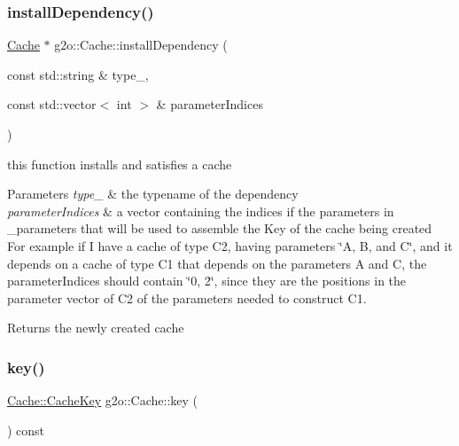 \mbox{\label{classg2o_1_1_cache_a776574fb98726ff61bc1280ea624c6e5}} 
\subsubsection{\texorpdfstring{install\+Dependency()}{installDependency()}}
{\footnotesize\ttfamily \mbox{\hyperlink{classg2o_1_1_cache}{Cache}} $\ast$ g2o\+::\+Cache\+::install\+Dependency (\begin{DoxyParamCaption}\item[{const std\+::string \&}]{type\+\_\+,  }\item[{const std\+::vector$<$ int $>$ \&}]{parameter\+Indices }\end{DoxyParamCaption})\hspace{0.3cm}{\ttfamily [protected]}}

this function installs and satisfies a cache 
\begin{DoxyParams}{Parameters}
{\em type\+\_\+} & the typename of the dependency \\
\hline
{\em parameter\+Indices} & a vector containing the indices if the parameters in \+\_\+parameters that will be used to assemble the Key of the cache being created For example if I have a cache of type C2, having parameters \char`\"{}\+A, B, and C\char`\"{}, and it depends on a cache of type C1 that depends on the parameters A and C, the parameter\+Indices should contain \char`\"{}0, 2\char`\"{}, since they are the positions in the parameter vector of C2 of the parameters needed to construct C1. \\
\hline
\end{DoxyParams}
\begin{DoxyReturn}{Returns}
the newly created cache 
\end{DoxyReturn}
\mbox{\label{classg2o_1_1_cache_a2e0a0de318ff4a0f50c263869a87908b}} 
\subsubsection{\texorpdfstring{key()}{key()}}
{\footnotesize\ttfamily \mbox{\hyperlink{classg2o_1_1_cache_1_1_cache_key}{Cache\+::\+Cache\+Key}} g2o\+::\+Cache\+::key (\begin{DoxyParamCaption}{ }\end{DoxyParamCaption}) const}

